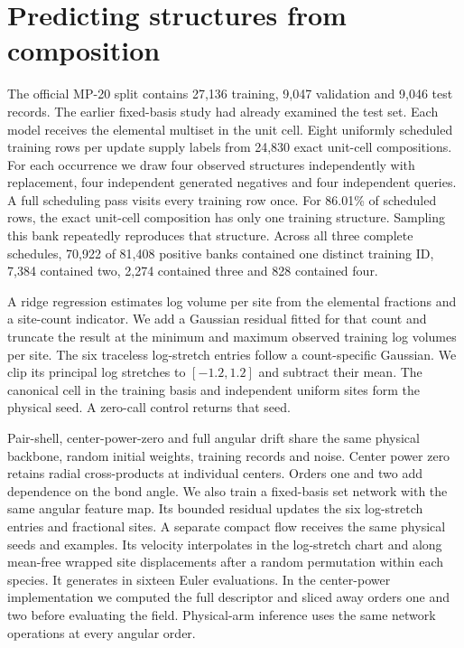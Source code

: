 \section{Predicting structures from composition}\label{sec:formula-csp}
The official MP-20 split contains 27,136 training, 9,047 validation and 9,046 test records. The earlier fixed-basis study had already examined the test set. Each model receives the elemental multiset in the unit cell. Eight uniformly scheduled training rows per update supply labels from 24,830 exact unit-cell compositions. For each occurrence we draw four observed structures independently with replacement, four independent generated negatives and four independent queries. A full scheduling pass visits every training row once. For 86.01\% of scheduled rows, the exact unit-cell composition has only one training structure. Sampling this bank repeatedly reproduces that structure. Across all three complete schedules, 70,922 of 81,408 positive banks contained one distinct training ID, 7,384 contained two, 2,274 contained three and 828 contained four.

A ridge regression estimates log volume per site from the elemental fractions and a site-count indicator. We add a Gaussian residual fitted for that count and truncate the result at the minimum and maximum observed training log volumes per site. The six traceless log-stretch entries follow a count-specific Gaussian. We clip its principal log stretches to $[-1.2,1.2]$ and subtract their mean. The canonical cell in the training basis and independent uniform sites form the physical seed. A zero-call control returns that seed.

Pair-shell, center-power-zero and full angular drift share the same physical backbone, random initial weights, training records and noise. Center power zero retains radial cross-products at individual centers. Orders one and two add dependence on the bond angle. We also train a fixed-basis set network with the same angular feature map. Its bounded residual updates the six log-stretch entries and fractional sites. A separate compact flow receives the same physical seeds and examples. Its velocity interpolates in the log-stretch chart and along mean-free wrapped site displacements after a random permutation within each species. It generates in sixteen Euler evaluations. In the center-power implementation we computed the full descriptor and sliced away orders one and two before evaluating the field. Physical-arm inference uses the same network operations at every angular order.

